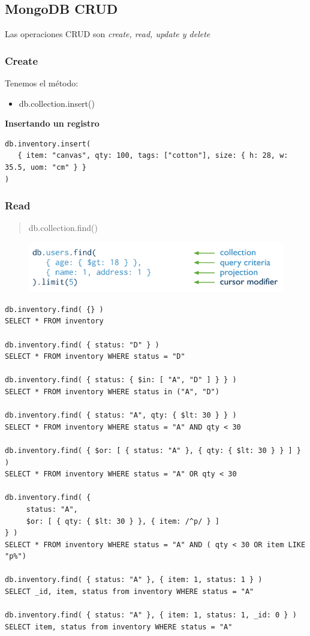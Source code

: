\documentclass[4paper]{article}
\begin{document}
\subsection{MongoDB CRUD}
Las operaciones CRUD son \emph{create, read, update y delete}\\
\subsubsection{Create}
Tenemos el método:
\begin{itemize}
\item db.collection.insert() 
\end{itemize}
\begin{large}
\textbf{Insertando un registro}
\end{large}
\begin{lstlisting}
db.inventory.insert(
   { item: "canvas", qty: 100, tags: ["cotton"], size: { h: 28, w: 35.5, uom: "cm" } }
)
\end{lstlisting}


\subsubsection{Read}
\begin{quote}
db.collection.find()
\end{quote}
\begin{figure}[H]
\includegraphics[scale=0.5]{query.png}
\end{figure}
\begin{lstlisting}
db.inventory.find( {} )
SELECT * FROM inventory

db.inventory.find( { status: "D" } )
SELECT * FROM inventory WHERE status = "D"

db.inventory.find( { status: { $in: [ "A", "D" ] } } )
SELECT * FROM inventory WHERE status in ("A", "D")

db.inventory.find( { status: "A", qty: { $lt: 30 } } )
SELECT * FROM inventory WHERE status = "A" AND qty < 30

db.inventory.find( { $or: [ { status: "A" }, { qty: { $lt: 30 } } ] } )
SELECT * FROM inventory WHERE status = "A" OR qty < 30

db.inventory.find( {
     status: "A",
     $or: [ { qty: { $lt: 30 } }, { item: /^p/ } ]
} )
SELECT * FROM inventory WHERE status = "A" AND ( qty < 30 OR item LIKE "p%")

db.inventory.find( { status: "A" }, { item: 1, status: 1 } )
SELECT _id, item, status from inventory WHERE status = "A"

db.inventory.find( { status: "A" }, { item: 1, status: 1, _id: 0 } )
SELECT item, status from inventory WHERE status = "A"
\end{lstlisting}
\end{document}
